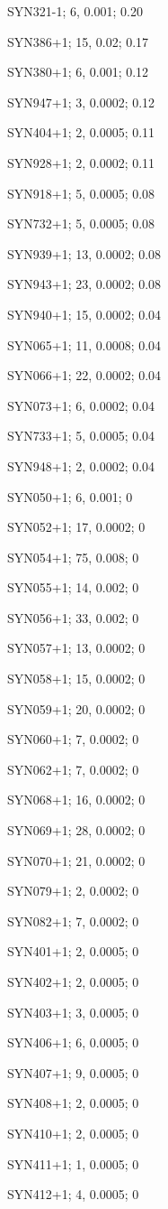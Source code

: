 SYN321-1; 6, 0.001; 0.20

SYN386+1; 15, 0.02; 0.17

SYN380+1; 6, 0.001; 0.12

SYN947+1; 3, 0.0002; 0.12

SYN404+1; 2, 0.0005; 0.11

SYN928+1; 2, 0.0002; 0.11

SYN918+1; 5, 0.0005; 0.08

SYN732+1; 5, 0.0005; 0.08

SYN939+1; 13, 0.0002; 0.08

SYN943+1; 23, 0.0002; 0.08

SYN940+1; 15, 0.0002; 0.04

SYN065+1; 11, 0.0008; 0.04

SYN066+1; 22, 0.0002; 0.04

SYN073+1; 6, 0.0002; 0.04

SYN733+1; 5, 0.0005; 0.04

SYN948+1; 2, 0.0002; 0.04

SYN050+1; 6, 0.001; 0

SYN052+1; 17, 0.0002; 0

SYN054+1; 75, 0.008; 0

SYN055+1; 14, 0.002; 0

SYN056+1; 33, 0.002; 0

SYN057+1; 13, 0.0002; 0

SYN058+1; 15, 0.0002; 0

SYN059+1; 20, 0.0002; 0

SYN060+1; 7, 0.0002; 0

SYN062+1; 7, 0.0002; 0

SYN068+1; 16, 0.0002; 0

SYN069+1; 28, 0.0002; 0

SYN070+1; 21, 0.0002; 0

SYN079+1; 2, 0.0002; 0

SYN082+1; 7, 0.0002; 0

SYN401+1; 2, 0.0005; 0

SYN402+1; 2, 0.0005; 0

SYN403+1; 3, 0.0005; 0

SYN406+1; 6, 0.0005; 0

SYN407+1; 9, 0.0005; 0

SYN408+1; 2, 0.0005; 0

SYN410+1; 2, 0.0005; 0

SYN411+1; 1, 0.0005; 0

SYN412+1; 4, 0.0005; 0

